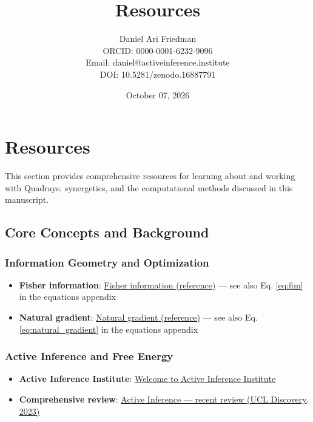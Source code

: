 \documentclass[
  10pt,
]{article}
\title{Resources}
\author{Daniel Ari Friedman\\ ORCID: 0000-0001-6232-9096\\ Email: daniel@activeinference.institute\\ DOI: 10.5281/zenodo.16887791}
\date{October 07, 2026}
\providecommand{\tightlist}{%
  \setlength{\itemsep}{0pt}\setlength{\parskip}{0pt}}
\begin{document}
\maketitle

{
\hypersetup{linkcolor=black}
\setcounter{tocdepth}{3}
\tableofcontents
}
\section{Resources}\label{resources}

This section provides comprehensive resources for learning about and
working with Quadrays, synergetics, and the computational methods
discussed in this manuscript.

\subsection{Core Concepts and
Background}\label{core-concepts-and-background}

\subsubsection{Information Geometry and
Optimization}\label{information-geometry-and-optimization}

\begin{itemize}
\tightlist
\item
  \textbf{Fisher information}:
  \href{https://en.wikipedia.org/wiki/Fisher_information}{Fisher
  information (reference)} --- see also Eq. \eqref{eq:fim} in the
  equations appendix
\item
  \textbf{Natural gradient}:
  \href{https://en.wikipedia.org/wiki/Natural_gradient}{Natural gradient
  (reference)} --- see also Eq. \eqref{eq:natural_gradient} in the
  equations appendix
\end{itemize}

\subsubsection{Active Inference and Free
Energy}\label{active-inference-and-free-energy}

\begin{itemize}
\tightlist
\item
  \textbf{Active Inference Institute}:
  \href{https://welcome.activeinference.institute/}{Welcome to Active
  Inference Institute}
\item
  \textbf{Comprehensive review}:
  \href{https://discovery.ucl.ac.uk/id/eprint/10176959/1/1-s2.0-S1571064523001094-main.pdf}{Active
  Inference --- recent review (UCL Discovery, 2023)}
\end{itemize}
\end{document}
